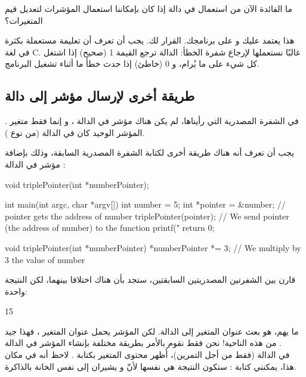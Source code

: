 \begin{question}
	ما الفائدة الآن من استعمال
في دالة إذا كان بإمكاننا استعمال المؤشرات لتعديل قيم المتغيرات؟
\end{question}

هذا يعتمد عليك و على برنامجك. القرار لك. يجب أن تعرف أن تعليمة
مستعملة بكثرة في لغة \textenglish{C}.
غالبًا نستعملها لإرجاع شفرة الخطأ: الدالة ترجع القيمة 1 (صحيح) إذا اشتغل كل شيء على ما يُرام، و 0 (خاطئ) إذا حدث خطأ ما أثناء تشغيل البرنامج.

\subsection{طريقة أخرى لإرسال مؤشر إلى دالة}
في الشفرة المصدرية التي رأيناها، لم يكن هناك مؤشر في الدالة
،
و إنما فقط متغير
.
المؤشر الوحيد كان في الدالة
(من نوع
).

يجب أن تعرف أنه هناك طريقة أخرى لكتابة الشفرة المصدرية السابقة، وذلك بإضافة مؤشر في الدالة
:

\begin{Csource}
void triplePointer(int *numberPointer);

int main(int argc, char *argv[])
{
	int number = 5;
	int *pointer = &number; // pointer gets the address of number
	triplePointer(pointer); // We send pointer (the address of number) to the function
	printf("%
	return 0;
}

void triplePointer(int *numberPointer)
{
	*numberPointer *= 3; // We multiply by 3 the value of number
}
\end{Csource}

قارن بين الشفرتين المصدريتين السابقتين، ستجد بأن هناك اختلافا بينهما، لكن النتيجة واحدة:

\begin{Console}
15
\end{Console}

ما يهم، هو بعث عنوان المتغير
إلى الدالة. لكن المؤشر يحمل عنوان المتغير
،
فهذا جيد من هذه الناحية! نحن فقط نقوم بالأمر بطريقة مختلفة بإنشاء المؤشر في الدالة
.\\
في الدالة
(فقط من أجل التمرين)، أُظهر محتوى المتغير
بكتابة
.
لاحظ أنه في مكان هذا، يمكنني كتابة
: ستكون النتيجة هي نفسها لأنّ
و
يشيران إلى نفس الخانة بالذاكرة.

